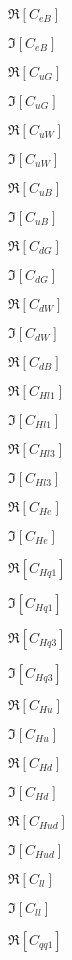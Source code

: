 \documentclass{article}
\begin{document}
$ \Re \left[ C_{eB } \right]$
\pagebreak

$ \Im \left[ C_{eB } \right]$
\pagebreak

$ \Re \left[ C_{uG } \right]$
\pagebreak

$ \Im \left[ C_{uG } \right]$
\pagebreak

$ \Re \left[ C_{uW } \right]$
\pagebreak

$ \Im \left[ C_{uW } \right]$
\pagebreak

$ \Re \left[ C_{uB } \right]$
\pagebreak

$ \Im \left[ C_{uB } \right]$
\pagebreak

$ \Re \left[ C_{dG } \right]$
\pagebreak

$ \Im \left[ C_{dG } \right]$
\pagebreak

$ \Re \left[ C_{dW } \right]$
\pagebreak

$ \Im \left[ C_{dW } \right]$
\pagebreak

$ \Re \left[ C_{dB } \right]$
\pagebreak

$ \Re \left[ C_{Hl1} \right]$
\pagebreak

$ \Im \left[ C_{Hl1} \right]$
\pagebreak

$ \Re \left[ C_{Hl3} \right]$
\pagebreak

$ \Im \left[ C_{Hl3} \right]$
\pagebreak

$ \Re \left[ C_{He} \right]$
\pagebreak

$ \Im \left[ C_{He} \right]$
\pagebreak

$ \Re \left[ C_{Hq1} \right]$
\pagebreak

$ \Im \left[ C_{Hq1} \right]$
\pagebreak

$ \Re \left[ C_{Hq3} \right]$
\pagebreak

$ \Im \left[ C_{Hq3} \right]$
\pagebreak

$ \Re \left[ C_{Hu} \right]$
\pagebreak

$ \Im \left[ C_{Hu} \right]$
\pagebreak

$ \Re \left[ C_{Hd} \right]$
\pagebreak

$ \Im \left[ C_{Hd} \right]$
\pagebreak

$ \Re \left[ C_{Hud} \right]$
\pagebreak

$ \Im \left[ C_{Hud} \right]$
\pagebreak

$ \Re \left[ C_{ll} \right]$
\pagebreak

$ \Im \left[ C_{ll} \right]$
\pagebreak

$ \Re \left[ C_{qq1} \right]$
\pagebreak
\end{document}
